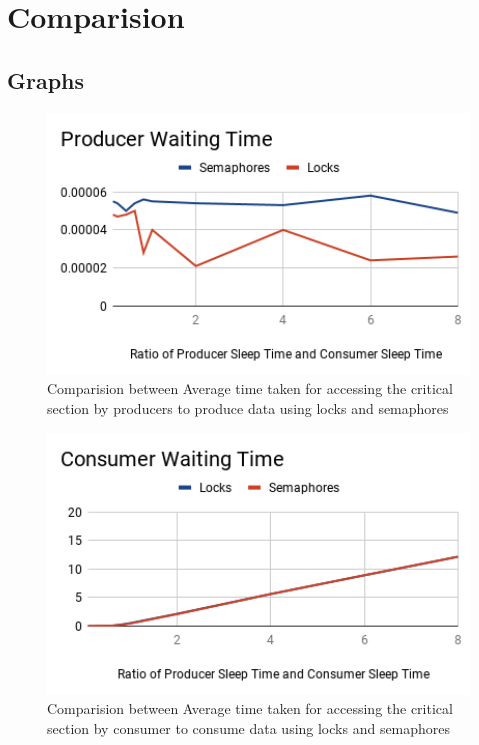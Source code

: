 \documentclass[12pt]{article}
\begin{document}
\pagebreak

\section{Comparision}
\subsection{Graphs}
\begin{figure}[ht!]
\includegraphics[width=150mm]{Producer_Waiting_Time.png}
\caption{Comparision between Average time taken for accessing the critical section by producers to produce data using locks and semaphores}
\end{figure}
\begin{figure}[ht!]
\includegraphics[width=150mm]{Consumer_Waiting_Time.png}
\caption{Comparision between Average time taken for accessing the critical section by consumer to consume data using locks and semaphores}
\end{figure}
\pagebreak
\end{document}
